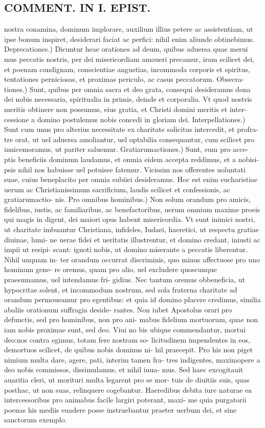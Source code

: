 \documentclass{article}
\begin{document}
\begin{pages}
\section*{COMMENT. IN I. EPIST. }
\marginpar{[ p.480 ]}\pstart nostra conamina, dominum implorare, auxilium illius petere ac assistentiam, ut ipse bonum inspiret, desiderari faciat ac perfici: nihil enim aliunde obtinebimus.  \pend\pstart Deprecationes.) Dicuntur heae orationes ad deum, quibus aduersa quae merui mus peccatis nostris, per dei misericordiam amoueri precamur, iram scilicet dei, et poenam condignam, conscientiae angustias, incommoda corporis et spiritus, tentationes perniciosas, et proximas periculo, ac casus peccatorum. Obsecra- tiones.) Sunt, quibus per omnia sacra et deo grata, consequi desideramus dona dei nobis necessaria, spiritualia in primis, deinde et corporalia. Vt quod nostris meritis obtinere non possumus, eius gratia, et Christi domini meritis et inter- cessione a domino postulemus nobis concedi in gloriam dei. Interpellationes.) Sunt cum unus pro alterius necessitate ex charitate solicitus intercedit, et profra- tre orat, ut uel aduersa amoliantur, uel optabilia consequantur, cum scilicet pro inuicemoramus, ut pariter saluemur. Gratiarumactiones.) Sunt, eum pro acce- ptis beneficiis dominum laudamus, et omnia eidem accepta reddimus, et a nobisi- psis nihil nos habuisse uel potuisse fatemur. Vicissim nos offerentes uoluntati suae, cuius beneplacito per omnia subiiei desideramus. Hoc est enim eucharistiae uerum ac Christianissimum sacrificium, laudis scilicet et confessionis, ac gratiarumactio- nis. Pro omnibus hominibus.) Non solum orandum pro amicis, fidelibus, iustis, ac familiaribus, ac benefactoribus, uerum omnium maxime proeis qui magis in digent, dei maiori opus habent misericordia. Vt sunt inimici nostri, ut charitate imbuantur Christiana, infideles, Iudaei, haeretici, ut respectu gratiae diuinae, lumi- ne uerae fidei et ueritatis illustrentur, et domino credant, iniusti ac impii ut resipi- scant: ignoti nobis, ut domino miserante a peccatis liberentur. Nihil unquam in- ter orandum occurrat discriminis, quo minus affectuose pro uno hominum gene- re oremus, quam pro alio, uel excludere quoscunque  praesumamus, uel intendamus fri- gidius. Nec tantum oremus obbeneficia, ut hypocritae solent, et incommodum nostrum, sed sola fraterna charitate ad orandum permoueamur pro egentibus: et quia id domino placere credimus, similia abaliis orationum suffragia deside- rantes. Non iubet Apostolus orari pro defunctis, sed pro hominibus, non pro ani- mabus fidelium mortuorum, quae non iam nobis proximae sunt, sed deo. Viui no bis ubique  commendantur, mortui deo:nos contra egimus, totam fere nostram so- licitudinem impendentes in eos, demortuos scilicet, de quibus nobis dominus ni- hil praecepit. Pro his non piget nimium multa dare, agere, pati, interim tamen fra- tres indigentes, maximopere a deo nobis commissos, dissimulamus, et nihil iuua- mus. Sed haec excogitauit auaritia cleri, ut morituri multa legarent pro se mor- tuis de diuitiis suis, quas posthac, ut non suas, relinquere cogebantur. Haeredibus debita iure naturae ea intercessoribus pro animabus facile largiri poterant, maxi- me quia purgatorii poenas his mediis euadere posse instruebantur praeter uerbum dei, et sine sanctorum exemplo.  \pend

\end{pages}
\end{document}
